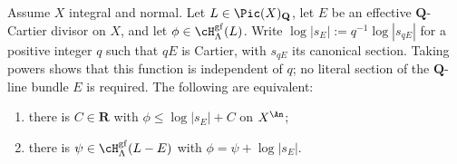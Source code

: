 \begin{proposition}
\label{prop:ch34-division}
Assume $X$ integral and normal.  Let $L\in\Pic(X)_{\mathbf Q}$,
let $E$ be an effective $\mathbf Q$-Cartier divisor on $X$, and let
$\phi\in\cH^{\mathrm{gf}}_\Lambda(L)$.  Write
$\log|s_E|:=q^{-1}\log|s_{qE}|$ for a positive integer $q$ such that
$qE$ is Cartier, with $s_{qE}$ its canonical section.  Taking powers
shows that this function is independent of $q$; no literal section of
the $\mathbf Q$-line bundle $E$ is required.  The following are equivalent:
\begin{enumerate}
\item there is $C\in\mathbf R$ with $\phi\le\log|s_E|+C$ on
  $X^{\An}$;
\item there is $\psi\in\cH^{\mathrm{gf}}_\Lambda(L-E)$ with
  $\phi=\psi+\log|s_E|$.
\end{enumerate}
\par
\end{proposition}


